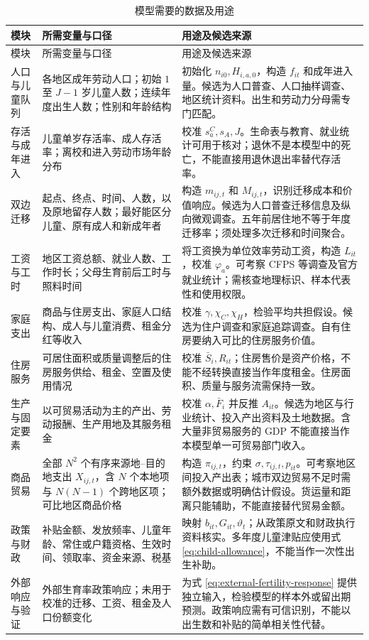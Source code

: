 \documentclass[UTF8,a4paper,zihao=-4,fontset=windows]{ctexart}
\numberwithin{equation}{section}
\begin{document}
\small
\begin{longtable}{L{0.16\textwidth}L{0.34\textwidth}L{0.40\textwidth}}
\caption{模型需要的数据及用途}\label{tab:data}\\
\toprule
模块 & 所需变量与口径 & 用途及候选来源\\
\midrule
\endfirsthead
\toprule
模块 & 所需变量与口径 & 用途及候选来源\\
\midrule
\endhead
\bottomrule
\endfoot
人口与儿童队列 & 各地区成年劳动人口；初始 $1$ 至 $J-1$ 岁儿童人数；连续年度出生人数；性别和年龄结构 & 初始化 $n_{i0},H_{i,a,0}$，构造 $f_{it}$ 和成年进入量。候选为人口普查、人口抽样调查、地区统计资料。出生和劳动力分母需专门匹配。\\
存活与成年进入 & 儿童单岁存活率、成人存活率；离校和进入劳动市场年龄分布 & 校准 $s^C_a,s_A,J$。生命表与教育、就业统计可用于核对；退休不是本模型中的死亡，不能直接用退休退出率替代存活率。\\
双边迁移 & 起点、终点、时间、人数，以及原地留存人数；最好能区分儿童、原有成人和新成年者 & 构造 $m_{ij,t}$ 和 $M_{ij,t}$，识别迁移成本和价值响应。候选为人口普查迁移信息及纵向微观调查。五年前居住地不等于年度迁移率；须处理多次迁移和时间聚合。\\
工资与工时 & 地区工资总额、就业人数、工作时长；父母生育前后工时与照料时间 & 将工资换为单位效率劳动工资，构造 $L_{it}$，校准 $\varphi_a$。可考察 CFPS 等调查及官方就业统计；需核查地理标识、样本代表性和使用权限。\\
家庭支出 & 商品与住房支出、家庭人口结构、成人与儿童消费、租金分红等收入 & 校准 $\gamma,\chi_C,\chi_H$，检验平均共担假设。候选为住户调查和家庭追踪调查。自有住房要纳入可比的住房服务价值。\\
住房服务 & 可居住面积或质量调整后的住房服务供给、租金、空置及使用情况 & 校准 $\bar S_i,R_{it}$；住房售价是资产价格，不能不经转换直接当作年度租金。住房面积、质量与服务流需保持一致。\\
生产与固定要素 & 以可贸易活动为主的产出、劳动报酬、生产用地及其服务租金 & 校准 $\alpha,\bar F_i$ 并反推 $A_{it}$。候选为地区与行业统计、投入产出资料及土地数据。含大量非贸易服务的 GDP 不能直接当作本模型单一可贸易部门收入。\\
商品贸易 & 全部 $N^2$ 个有序来源地--目的地支出 $X_{ij,t}$，含 $N$ 个本地项与 $N(N-1)$ 个跨地区项；可比地区商品价格 & 构造 $\pi_{ij,t}$，约束 $\sigma,\tau_{ij,t},p_{it}$。可考察地区间投入产出表；城市双边贸易不足时需额外数据或明确估计假设。货运量和距离只能辅助，不能直接替代贸易金额。\\
政策与财政 & 补贴金额、发放频率、儿童年龄、常住或户籍资格、生效时间、领取率、资金来源、税基 & 映射 $b_{it},G_{it},\vartheta_t$；从政策原文和财政执行资料核实。多年度儿童津贴应使用式 \eqref{eq:child-allowance}，不能当作一次性出生补助。\\
外部响应与验证 & 外部生育率政策响应；未用于校准的迁移、工资、租金及人口份额变化 & 为式 \eqref{eq:external-fertility-response} 提供独立输入，检验模型的样本外或留出期预测。政策响应需有可信识别，不能以出生数和补贴的简单相关性代替。\\
\end{longtable}
\normalsize
\end{document}
